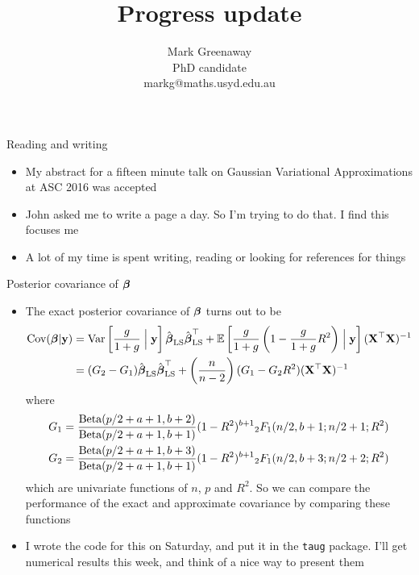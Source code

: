 \documentclass{beamer}
\title{Progress update}
\author{Mark Greenaway\\PhD candidate\\markg@maths.usyd.edu.au}
\begin{document}
\begin{frame}
\titlepage
\end{frame}

\begin{frame}{Reading and writing}
\begin{itemize}
\item My abstract for a fifteen minute talk on Gaussian Variational Approximations at ASC 2016 was accepted
\item John asked me to write a page a day. So I'm trying to do that. I find this focuses me
\item A lot of my time is spent writing, reading or looking for references for things
\end{itemize}
\end{frame}

\begin{frame}{Posterior covariance of ${\boldsymbol \beta}$}
\begin{itemize}
\item 
The exact posterior covariance of ${\boldsymbol \beta}$ turns out to be
\tiny
\begin{align*}
	\mbox{Cov}({\boldsymbol \beta}|{\bf y}) &=  \text{Var}\left[\frac{g}{1+g} \Bigm| {\bf y}\right] \hat{{\boldsymbol \beta}}_{\text{LS}} \hat{{\boldsymbol \beta}}_{\text{LS}}^\top + 
	 \mathbb{E}\left[\frac{g}{1 + g} \left( 1 - \frac{g}{1 + g} R^2 \right) \Bigm| {\bf y}\right] ({\bf X}^\top {\bf X})^{-1}\\
	&= (G_2 - G_1) \hat{{\boldsymbol \beta}}_{\text{LS}} \hat{{\boldsymbol \beta}}_{\text{LS}}^\top + \left( \frac{n}{n - 2} \right) (G_1 - G_2 R^2) ({\bf X}^\top {\bf X})^{-1}
\end{align*}
\small where \tiny
\begin{align*}
G_1 &= \frac{\text{Beta}(p/2 + a + 1, b + 2)}{\text{Beta}(p /2 + a + 1, b + 1)} (1 - R^2)^{b+1} {}_2 F_1(n/2, b + 1; n/2 + 1; R^2) \\
G_2 &= \frac{\text{Beta}(p/2 + a + 1, b + 3)}{\text{Beta}(p /2 + a + 1, b + 1)} (1 - R^2)^{b+1} {}_2 F_1(n/2, b + 3; n/2 + 2; R^2)
\end{align*}
\small
which are univariate functions of $n$, $p$ and $R^2$.
So we can compare the performance of the exact and approximate covariance by comparing these 
functions
\item I wrote the code for this on Saturday, and put it in the \texttt{taug} package. I'll get numerical 
results this week, and think of a nice way to present them
\end{itemize}
\end{frame}
\end{document}
